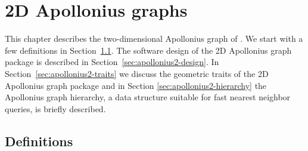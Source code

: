 
\chapter{2D Apollonius graphs}
\label{chapter-apollonius2}

\minitoc

This chapter describes the two-dimensional Apollonius graph
of \cgal. We start with a few definitions in 
Section~\ref{sec:apollonius2-definitions}.
The software design of the 2D Apollonius graph package is described 
in Section~\ref{sec:apollonius2-design}.
In Section~\ref{sec:apollonius2-traits} we discuss the geometric
traits of the 2D Apollonius graph package and in Section
\ref{sec:apollonius2-hierarchy} the Apollonius graph hierarchy, a data
structure suitable for fast nearest neighbor queries, is briefly
described.


\section{Definitions}
\label{sec:apollonius2-definitions}

